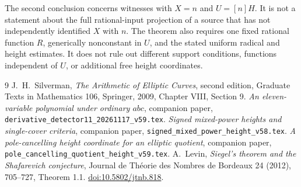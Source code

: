 \documentclass[11pt,a4paper]{article}
\begin{document}
The second conclusion concerns witnesses with $X=n$ and
$U=[n]H$. It is not a statement about the full rational-input
projection of a source that has not independently identified
$X$ with $n$. The theorem also requires one fixed rational
function $R$, generically nonconstant in $U$, and the stated
uniform radical and height estimates. It does not rule out
different support conditions, functions independent of $U$,
or additional free height coordinates.

\begin{thebibliography}{9}
J.~H.~Silverman, \emph{The Arithmetic of Elliptic Curves},
second edition, Graduate Texts in Mathematics 106, Springer, 2009,
Chapter VIII, Section 9.
\emph{An eleven-variable polynomial under ordinary
$abc$}, companion paper, \nolinkurl{derivative_detector11_20261117_v59.tex}.
\emph{Signed mixed-power heights and single-cover
criteria}, companion paper, \nolinkurl{signed_mixed_power_height_v58.tex}.
\emph{A pole-cancelling height coordinate for an
elliptic quotient}, companion paper,
\nolinkurl{pole_cancelling_quotient_height_v59.tex}.
A.~Levin, \emph{Siegel's theorem and the Shafarevich
conjecture}, Journal de Th\'eorie des Nombres de Bordeaux 24 (2012),
705--727, Theorem 1.1. \href{https://doi.org/10.5802/jtnb.818}{doi:10.5802/jtnb.818}.
\end{thebibliography}
\end{document}
